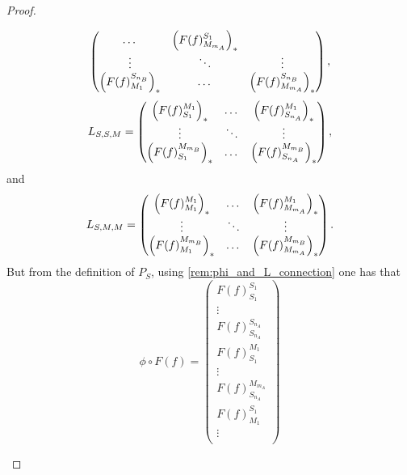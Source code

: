 \begin{proof}
\begin{enumerate}
{\[\begin{pmatrix}
                    \dots &
                    \left(  F(f)_{M_{m_A}}^{S_1}  \right)_* \\
                    \vdots & \ddots & \vdots \\
                    \left(  F(f)_{M_1}^{S_{n_B}}  \right)_* &
                    \dots &
                    \left(  F(f)_{M_{m_A}}^{S_{n_B}}  \right)_* \\
                \end{pmatrix},
            \]
            \[
                L_{S, S, M} =
                \begin{pmatrix}
                    \left(  F(f)_{S_1}^{M_1}  \right)_* &
                    \dots &
                    \left(  F(f)_{S_{n_A}}^{M_1}  \right)_* \\
                    \vdots & \ddots & \vdots \\
                    \left(  F(f)_{S_1}^{M_{m_B}}  \right)_* &
                    \dots &
                    \left(  F(f)_{S_{n_A}}^{M_{m_B}}  \right)_* \\
                \end{pmatrix},
            \]
            and
            \[
                L_{S, M, M} =
                \begin{pmatrix}
                    \left(  F(f)_{M_1}^{M_1}  \right)_* &
                    \dots &
                    \left(  F(f)_{M_{m_A}}^{M_1}  \right)_* \\
                    \vdots & \ddots & \vdots \\
                    \left(  F(f)_{M_1}^{M_{m_B}}  \right)_* &
                    \dots &
                    \left(  F(f)_{M_{m_A}}^{M_{m_B}}  \right)_* \\
                \end{pmatrix}.
            \]
            But from the definition of \( P_S \), using \autoref{rem:phi_and_L_connection} one has that
            \[
                \phi \circ F(f) =
                \begin{pmatrix}
                    F(f)_{S_1}^{S_1} \\
                    \vdots \\
                    F(f)_{S_{n_A}}^{S_{n_A}} \\
                    F(f)_{S_1}^{M_1} \\
                    \vdots \\
                    F(f)_{S_{n_A}}^{M_{m_A}} \\
                    F(f)_{M_1}^{S_1} \\
                    \vdots \\

\end{pmatrix}\]}
\end{enumerate}
\end{proof}
